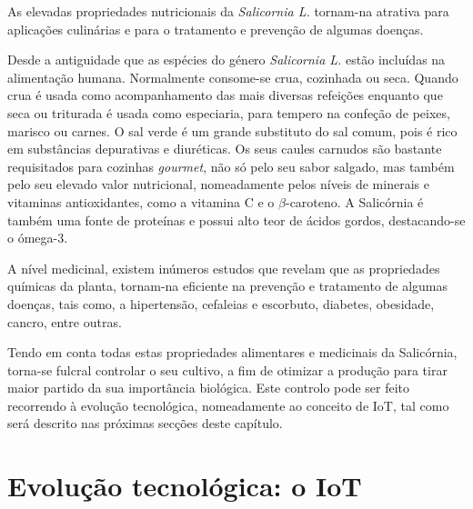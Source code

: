 As elevadas propriedades nutricionais da \textit{Salicornia L.} tornam-na atrativa para aplicações culinárias e para o tratamento e prevenção de algumas doenças. 


Desde a antiguidade que as espécies do género \textit{Salicornia L.} estão incluídas na alimentação humana. Normalmente consome-se crua, cozinhada ou seca. Quando crua é usada como acompanhamento das mais diversas refeições enquanto que seca ou triturada é usada como especiaria, para tempero na confeção de peixes, marisco ou carnes. O sal verde é um grande substituto do sal comum, pois é rico em substâncias depurativas e diuréticas. Os seus caules carnudos são bastante requisitados para cozinhas \textit{gourmet}, não só pelo seu sabor salgado, mas também pelo seu elevado valor nutricional\cite{Filomena2009}, nomeadamente pelos níveis de minerais e vitaminas antioxidantes, como a  vitamina C e o $\beta$-caroteno. A Salicórnia é também uma fonte de proteínas e possui alto teor de ácidos gordos, destacando-se o  ómega-3\cite{Ventura2011}. 

A nível medicinal, existem inúmeros estudos que revelam que as propriedades químicas da planta, tornam-na eficiente na prevenção e tratamento de algumas doenças, tais como, a hipertensão, cefaleias e escorbuto, diabetes, obesidade, cancro, entre outras\cite{Wang2012}.

Tendo em conta todas estas propriedades alimentares e medicinais da Salicórnia, torna-se fulcral controlar o seu cultivo, a fim de otimizar a produção para tirar maior partido da sua importância biológica. Este controlo pode ser feito recorrendo à evolução tecnológica, nomeadamente ao conceito de \ac{IoT}, tal como será descrito nas próximas secções deste capítulo. 


















\section{Evolução tecnológica: o \acs{IoT}}


